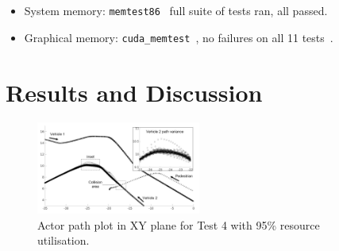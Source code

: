 \begin{itemize}[leftmargin=*]
    \item System memory: \texttt{memtest86}~\cite{MemTest86} full suite of tests ran, all passed.
    \item Graphical memory: \texttt{cuda\_memtest}~\cite{cuda_memtest}, no failures on all 11 tests~\cite{shi2009testing}.
\end{itemize}

\section{Results and Discussion}\label{s:FinalResultsSection}
\begin{figure}[t]
    \centering
    \includegraphics[width=0.48\textwidth]{../other/figures/actor_path_plot.jpg}
    \caption{Actor path plot in XY plane for Test 4 with 95\% resource utilisation.}
    \label{actorPathPlot}
\end{figure}

